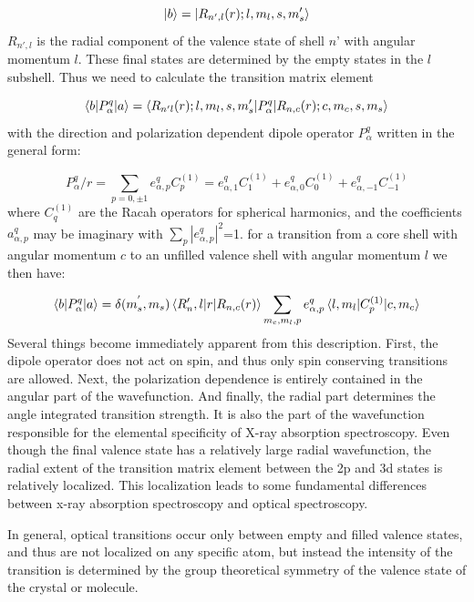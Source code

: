 \begin{equation}
\ket{b}=\ket{R_{n',l}(r);l,m_l,s,m_s'}
\end{equation}
$R_{n',l}$ is the radial component of the valence state of shell $n$' with angular momentum $l$. These final  states are determined by the empty states in the $l$ subshell. Thus we need to calculate the transition matrix element

\begin{equation}
\braket{b|P_\alpha^q|a}=\braket{R_{n'l}(r);l,m_l,s,m_s'|P_\alpha^q|R_{n,c}(r);c,m_c,s,m_s}
\end{equation}
with the direction and polarization dependent dipole operator $P_\alpha^q$ written in the general form:

\begin{equation}
P_\alpha^q/r = \sum_{p=0,\pm 1}e_{\alpha,p}^qC_p^{(1)}=e_{\alpha,1}^qC_1^{(1)}+e_{\alpha,0}^qC_0^{(1)}+e_{\alpha,-1}^qC_{-1}^{(1)}
\end{equation}
where $C_q^{(1)}$ are the Racah operators for spherical harmonics, and the coefficients $a_{\alpha,p}^q$ may be imaginary with $\sum_p|e^q_{\alpha,p}|^2$=1. for a transition from a core shell with angular momentum $c$ to an unfilled valence shell with angular momentum $l$ we then have:

\begin{equation}
\braket{b|P_\alpha^q|a}=\delta(m_s^{'},m_s)\braket{R_n',l|r|R_{n,c}(r)}\sum_{m_c,m_l,p}e_{\alpha,p}^q\braket{l,m_l|C_p^{(1)}|c,m_c}
\end{equation}
Several things become immediately apparent from this description. First, the dipole operator does not act on spin, and thus only spin conserving transitions are allowed. Next, the polarization dependence is entirely contained in the angular part of the wavefunction. And finally, the radial part determines the angle integrated transition strength. It is also the part of the wavefunction responsible for the elemental specificity of X-ray absorption spectroscopy. Even though the final valence state has a relatively large radial wavefunction, the radial extent of the transition matrix element between the 2p and 3d states is relatively localized. This localization leads to some fundamental differences between x-ray absorption spectroscopy and optical spectroscopy.

In general, optical transitions occur only between empty and filled valence states, and thus are not localized on any specific atom, but instead the intensity of the transition is determined by the group theoretical symmetry of the valence state of the crystal or molecule.

